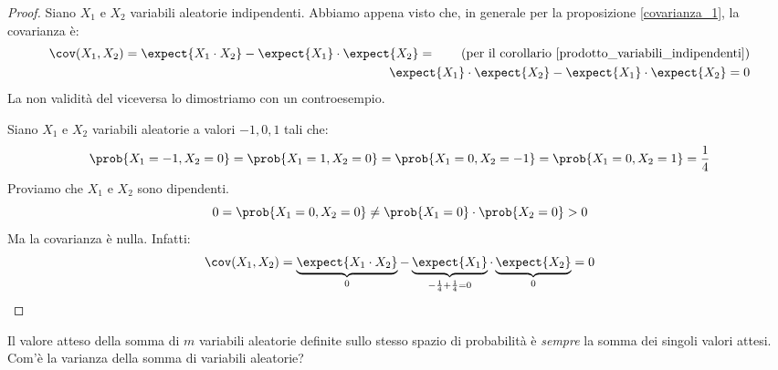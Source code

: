 \begin{proof}
Siano $X_1$ e $X_2$ variabili aleatorie indipendenti. Abbiamo appena visto che, in generale per la proposizione \ref{covarianza_1}, la covarianza \`e:
\begin{align*}
\cov(X_1, X_2) = \expect{X_1 \cdot X_2} - \expect{X_1} \cdot \expect{X_2} = \tag{per il corollario \ref{prodotto_variabili_indipendenti}} \\
\expect{X_1} \cdot \expect{X_2} - \expect{X_1} \cdot \expect{X_2} = 0
\end{align*}
La non validit\`a del viceversa lo dimostriamo con un controesempio.

Siano $X_1$ e $X_2$ variabili aleatorie a valori $-1, 0, 1$ tali che:
\[
\prob{X_1 = -1, X_2 = 0} = \prob{X_1 = 1, X_2 = 0} = \prob{X_1 = 0, X_2 = -1} = \prob{X_1 = 0, X_2 = 1} = \frac{1}{4}
\]
Proviamo che $X_1$ e $X_2$ sono dipendenti.
\[
0 = \prob{X_1 = 0, X_2 = 0} \neq \prob{X_1 = 0} \cdot \prob{X_2 = 0} > 0
\]
Ma la covarianza \`e nulla. Infatti:
\[
\cov (X_1, X_2) = \underbrace{\expect{X_1 \cdot X_2}}_{0} - \underbrace{\expect{X_1}}_{-\frac{1}{4} + \frac{1}{4} = 0} \cdot \underbrace{\expect{X_2}}_{0} = 0
\]
\end{proof}

Il valore atteso della somma di $m$ variabili aleatorie definite sullo stesso spazio di probabilit\`a \`e \emph{sempre} la somma dei singoli valori attesi. Com'\`e la varianza della somma di variabili aleatorie?

